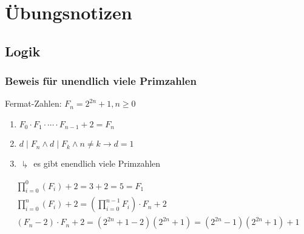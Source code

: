 \part{Übungsnotizen}
\setcounter{chapter}{0}
\chapter{Logik}
\section{Beweis für unendlich viele Primzahlen}

Fermat-Zahlen: $F_n = 2^{2n} +1 , n \geq 0$ \\
\begin{enumerate}
	\renewcommand{\labelenumi}{\alph{enumi})}
	\item $F_0 \cdot F_1 \cdot \dotsm \cdot F_{n-1} + 2 = F_n$
	\item $d \mid F_n \wedge d \mid F_k \wedge n \neq k \rightarrow d = 1$
	\item $\drsh$ es gibt enendlich viele Primzahlen
\end{enumerate}
\begin{gather*}
	\prod_{i=0}^0 ( F_i ) + 2 = 3 + 2 = 5 = F_1 \\
	\prod_{i=0}^n ( F_i ) + 2 = ( \prod_{i=0}^{n-1} F_i ) \cdot F_n + 2 \\
	( F_n - 2 ) \cdot F_n + 2 = ( 2^{2n} + 1 - 2)(2^{2n} + 1) = ( 2^{2n} -1 )( 2^{2n} +1 ) +1
\end{gather*}
